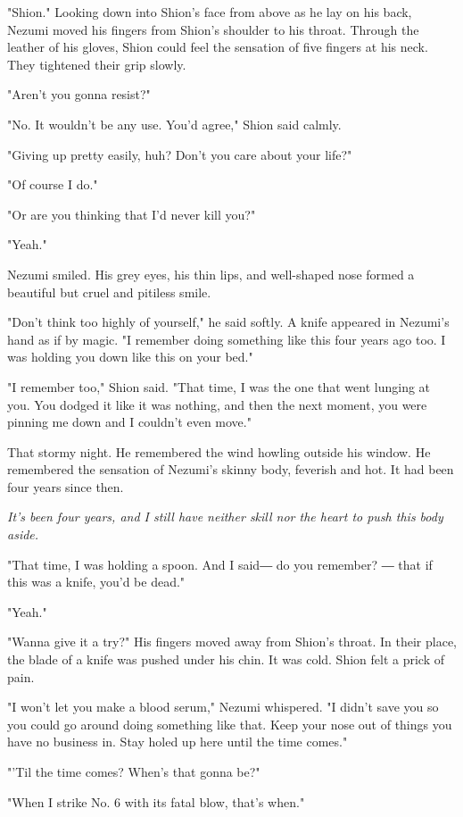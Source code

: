 "Shion." Looking down into Shion's face from above as he lay on his
back, Nezumi moved his fingers from Shion's shoulder to his throat.
Through the leather of his gloves, Shion could feel the sensation of
five fingers at his neck. They tightened their grip slowly.

"Aren't you gonna resist?"

"No. It wouldn't be any use. You'd agree," Shion said calmly.

"Giving up pretty easily, huh? Don't you care about your life?"

"Of course I do."

"Or are you thinking that I'd never kill you?"

"Yeah."

Nezumi smiled. His grey eyes, his thin lips, and well-shaped nose formed
a beautiful but cruel and pitiless smile.

"Don't think too highly of yourself," he said softly. A knife appeared
in Nezumi's hand as if by magic. "I remember doing something like this
four years ago too. I was holding you down like this on your bed."

"I remember too," Shion said. "That time, I was the one that went
lunging at you. You dodged it like it was nothing, and then the next
moment, you were pinning me down and I couldn't even move."

That stormy night. He remembered the wind howling outside his window. He
remembered the sensation of Nezumi's skinny body, feverish and hot. It
had been four years since then.

\emph{It's been four years, and I still have neither skill nor the heart to
	push this body aside.}

"That time, I was holding a spoon. And I said― do you remember? ― that
if this was a knife, you'd be dead."

"Yeah."

"Wanna give it a try?" His fingers moved away from Shion's throat. In
their place, the blade of a knife was pushed under his chin. It was
cold. Shion felt a prick of pain.

"I won't let you make a blood serum," Nezumi whispered. "I didn't save
you so you could go around doing something like that. Keep your nose out
of things you have no business in. Stay holed up here until the time
comes."

"'Til the time comes? When's that gonna be?"

"When I strike No. 6 with its fatal blow, that's when."

